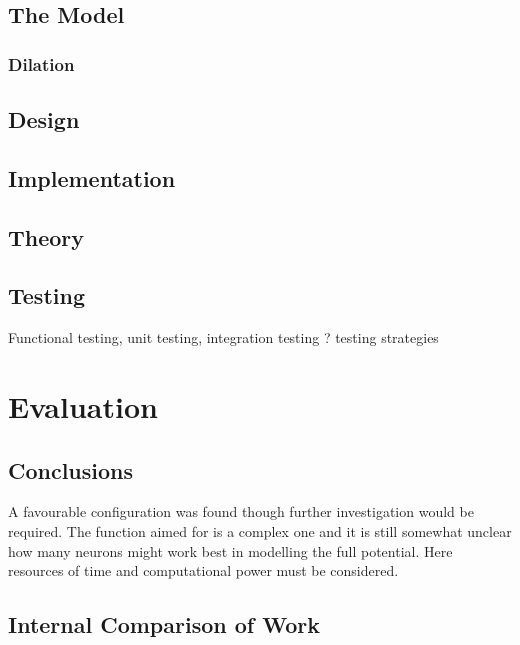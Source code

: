 \documentclass[12pt,]{article}
\begin{document}
\hypertarget{the-model}{%
\subsection{The Model}\label{the-model}}

\hypertarget{dilation-1}{%
\subsubsection{Dilation}\label{dilation-1}}

\hypertarget{design}{%
\subsection{Design}\label{design}}

\hypertarget{implementation}{%
\subsection{Implementation}\label{implementation}}

\hypertarget{theory-1}{%
\subsection{Theory}\label{theory-1}}

\hypertarget{testing}{%
\subsection{Testing}\label{testing}}

Functional testing, unit testing, integration testing ? testing
strategies

\hypertarget{evaluation}{%
\section{Evaluation}\label{evaluation}}

\hypertarget{conclusions}{%
\subsection{Conclusions}\label{conclusions}}

A favourable configuration was found though further investigation would
be required. The function aimed for is a complex one and it is still
somewhat unclear how many neurons might work best in modelling the full
potential. Here resources of time and computational power must be
considered.

\hypertarget{internal-comparison-of-work}{%
\subsection{Internal Comparison of
Work}\label{internal-comparison-of-work}}
\end{document}
